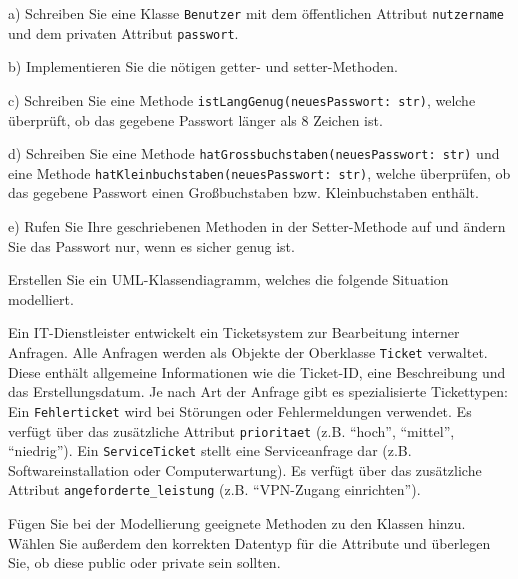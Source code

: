 \documentclass[11pt, a4paper, oneside]{article}
\begin{document}
	a) Schreiben Sie eine Klasse \texttt{Benutzer} mit dem öffentlichen Attribut \texttt{nutzername} und dem privaten Attribut \texttt{passwort}.
	
	b) Implementieren Sie die nötigen getter- und setter-Methoden.
	
	c) Schreiben Sie eine Methode \texttt{istLangGenug(neuesPasswort: str)}, welche überprüft, ob das gegebene Passwort länger als 8 Zeichen ist.
	
	d) Schreiben Sie eine Methode \texttt{hatGrossbuchstaben(neuesPasswort: str)} und eine Methode \texttt{hatKleinbuchstaben(neuesPasswort: str)}, welche überprüfen, ob das gegebene Passwort einen Großbuchstaben bzw. Kleinbuchstaben enthält.
	
	
	e) Rufen Sie Ihre geschriebenen Methoden in der Setter-Methode auf und ändern Sie das Passwort nur, wenn es sicher genug ist.
	
	
	Erstellen Sie ein UML-Klassendiagramm\footnotemark[4], welches die folgende Situation modelliert.
	
	Ein IT-Dienstleister entwickelt ein Ticketsystem zur Bearbeitung interner Anfragen.
	Alle Anfragen werden als Objekte der Oberklasse \texttt{Ticket} verwaltet.
	Diese enthält allgemeine Informationen wie die Ticket-ID, eine Beschreibung und das Erstellungsdatum.
	Je nach Art der Anfrage gibt es spezialisierte Tickettypen:
	Ein \texttt{Fehlerticket} wird bei Störungen oder Fehlermeldungen verwendet.
	Es verfügt über das zusätzliche Attribut \texttt{prioritaet} (z.B. ``hoch'', ``mittel'', ``niedrig'').
	Ein \texttt{ServiceTicket} stellt eine Serviceanfrage dar (z.B. Softwareinstallation oder Computerwartung).
	Es verfügt über das zusätzliche Attribut \texttt{angeforderte\_leistung} (z.B. ``VPN-Zugang einrichten'').
	
	Fügen Sie bei der Modellierung geeignete Methoden zu den Klassen hinzu.
	Wählen Sie außerdem den korrekten Datentyp für die Attribute und überlegen Sie, ob diese public oder private sein sollten.
	
	\pagebreak
	
	
\end{document}

